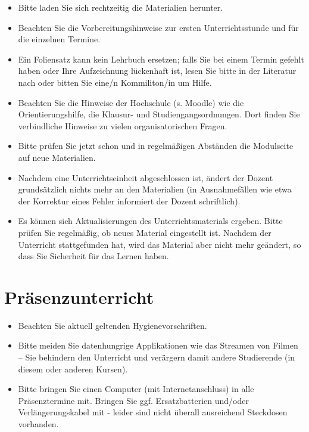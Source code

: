 \documentclass[
  a4paper,
  DIV=11]{scrreprt}
\providecommand{\tightlist}{%
  \setlength{\itemsep}{0pt}\setlength{\parskip}{0pt}}\usepackage{longtable,booktabs,array}
\theoremstyle{definition}
\theoremstyle{definition}
\theoremstyle{remark}
\begin{document}

\begin{itemize}
\tightlist
\item
  Bitte laden Sie sich rechtzeitig die Materialien herunter.
\item
  Beachten Sie die Vorbereitungshinweise zur ersten Unterrichtsstunde
  und für die einzelnen Termine.
\item
  Ein Foliensatz kann kein Lehrbuch ersetzen; falls Sie bei einem Termin
  gefehlt haben oder Ihre Aufzeichnung lückenhaft ist, lesen Sie bitte
  in der Literatur nach oder bitten Sie eine/n Kommiliton/in um Hilfe.
\item
  Beachten Sie die Hinweise der Hochschule (s. Moodle) wie die
  Orientierungshilfe, die Klausur- und Studiengangsordnungen. Dort
  finden Sie verbindliche Hinweise zu vielen organisatorischen Fragen.
\item
  Bitte prüfen Sie jetzt schon und in regelmäßigen Abständen die
  Modulseite auf neue Materialien.
\item
  Nachdem eine Unterrichtseinheit abgeschlossen ist, ändert der Dozent
  grundsätzlich nichts mehr an den Materialien (in Ausnahmefällen wie
  etwa der Korrektur eines Fehler informiert der Dozent schriftlich).
\item
  Es können sich Aktualisierungen des Unterrichtsmaterials ergeben.
  Bitte prüfen Sie regelmäßig, ob neues Material eingestellt ist.
  Nachdem der Unterricht stattgefunden hat, wird das Material aber nicht
  mehr geändert, so dass Sie Sicherheit für das Lernen haben.
\end{itemize}

\hypertarget{pruxe4senzunterricht}{%
\section*{Präsenzunterricht}\label{pruxe4senzunterricht}}


\begin{itemize}
\tightlist
\item
  Beachten Sie aktuell geltenden Hygienevorschriften.
\item
  Bitte meiden Sie datenhungrige Applikationen wie das Streamen von
  Filmen -- Sie behindern den Unterricht und verärgern damit andere
  Studierende (in diesem oder anderen Kursen).
\item
  Bitte bringen Sie einen Computer (mit Internetanschluss) in alle
  Präsenztermine mit. Bringen Sie ggf. Ersatzbatterien und/oder
  Verlängerungskabel mit - leider sind nicht überall ausreichend
  Steckdosen vorhanden.
\end{itemize}
\end{document}
